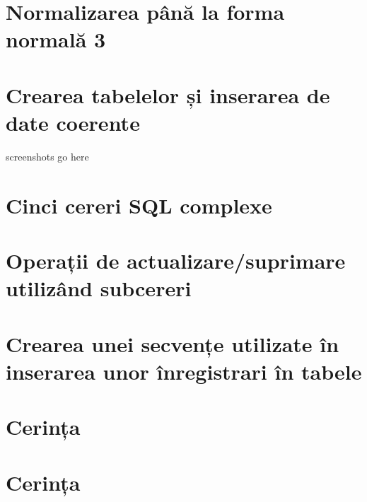 \documentclass[a4paper,oneside, 12pt]{article}
\begin{document}
\section{Normalizarea până la forma normală 3}

\section{Crearea tabelelor și inserarea de date coerente}

screenshots go here

\section{Cinci cereri SQL complexe}

\begin{center}

\minipage{\linewidth}

\endminipage

\minipage{\linewidth}

\endminipage

\minipage{\linewidth}

\endminipage

\minipage{\linewidth}

\endminipage

\minipage{\linewidth}

\endminipage

\end{center}

\section{Operații de actualizare/suprimare utilizând subcereri}

\minipage{\linewidth}

\endminipage

\section{Crearea unei secvențe utilizate în inserarea unor înregistrari în tabele}

\minipage{\linewidth}

\endminipage

\section{Cerința}
\section{Cerința}
\end{document}
